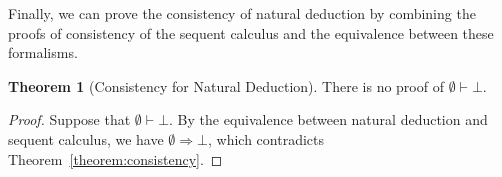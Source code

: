 \documentclass[12pt]{article}
\theoremstyle{definition}
\newtheorem{Theorem}{Theorem}
\begin{document}
Finally, we can prove the consistency of natural deduction by combining the
proofs of consistency of the sequent calculus and the equivalence between these
formalisms.

\begin{Theorem}[Consistency for Natural Deduction]
  There is no proof of $\emptyset \vdash \bot$.
\end{Theorem}
\begin{proof}
  Suppose that $\emptyset \vdash \bot$. By the equivalence between natural
  deduction and sequent calculus, we have $\emptyset\Rightarrow \bot$, which
  contradicts Theorem~\ref{theorem:consistency}.
\end{proof}  
\end{document}
